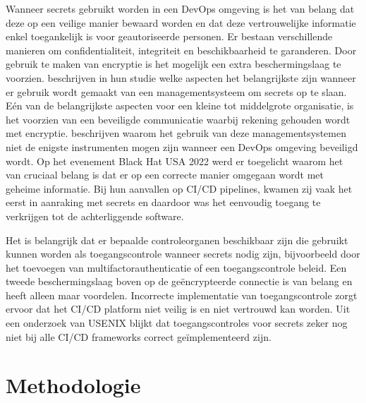 Wanneer secrets gebruikt worden in een DevOps omgeving is het van belang dat deze op een veilige manier bewaard worden en dat deze vertrouwelijke informatie enkel toegankelijk is voor geautoriseerde personen. Er bestaan verschillende manieren om confidentialiteit, integriteit en beschikbaarheid te garanderen. Door gebruik te maken van encryptie is het mogelijk een extra beschermingslaag te voorzien. \textcite{Kuzminykh2020} beschrijven in hun studie welke aspecten het belangrijkste zijn wanneer er gebruik wordt gemaakt van een managementsysteem om secrets op te slaan.  Eén van de belangrijkste aspecten voor een kleine tot middelgrote organisatie, is het voorzien van een beveiligde communicatie waarbij rekening gehouden wordt met encryptie. \autocite{Haymore2022} beschrijven waarom het gebruik van deze managementsystemen niet de enigste instrumenten mogen zijn wanneer een \mbox{DevOps} omgeving beveiligd wordt. Op het evenement Black Hat USA 2022 \autocite{Smart2022} werd er toegelicht waarom het van cruciaal belang is dat er op een correcte manier omgegaan wordt met geheime informatie. Bij hun aanvallen op CI/CD pipelines, kwamen zij vaak het eerst in aanraking met secrets en daardoor was het eenvoudig toegang te verkrijgen tot de achterliggende software. 

Het is belangrijk dat er bepaalde controleorganen beschikbaar zijn die gebruikt kunnen worden als toegangscontrole wanneer secrets nodig zijn, bijvoorbeeld door het toevoegen van multifactorauthenticatie of een toegangscontrole beleid. Een tweede beschermingslaag boven op de geëncrypteerde connectie is van belang en heeft alleen maar voordelen. Incorrecte implementatie van toegangscontrole zorgt ervoor dat het CI/CD platform niet veilig is en niet vertrouwd kan worden. Uit een onderzoek van USENIX \autocite{Koishybayev2022} blijkt dat toegangscontroles voor secrets zeker nog niet bij alle CI/CD frameworks correct geïmplementeerd zijn.




\section{Methodologie}%
\label{sec:methodologie}

